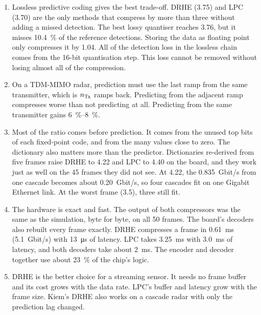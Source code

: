 \begin{enumerate}
\item Lossless predictive coding gives the best trade-off. DRHE (\num{3.75})
and LPC (\num{3.70}) are the only methods that compress by more than three
without adding a missed detection. The best lossy quantiser reaches
\num{3.76}, but it misses \SI{10.4}{\percent} of the reference detections.
Storing the data as floating point only compresses it by \num{1.04}. All of the
detection loss in the lossless chain comes from the 16-bit quantisation step.
This loss cannot be removed without losing almost all of the compression.

\item On a TDM-MIMO radar, prediction must use the last ramp from the same
transmitter, which is $n_{\mathrm{Tx}}$ ramps back. Predicting from the adjacent ramp
compresses worse than not predicting at all. Predicting from the same
transmitter gains \SIrange{6}{8}{\percent}.

\item Most of the ratio comes before prediction. It comes from the unused top
bits of each fixed-point code, and from the many values close to zero. The
dictionary also matters more than the predictor. Dictionaries re-derived from
five frames raise DRHE to \num{4.22} and LPC to \num{4.40} on the board, and
they work just as well on the 45 frames they did not see. At \num{4.22}, the
\SI{0.835}{Gbit/s} from one cascade becomes about \SI{0.20}{Gbit/s}, so four
cascades fit on one Gigabit Ethernet link. At the worst frame (\num{3.5}),
three still fit.

\item The hardware is exact and fast. The output of both compressors was the
same as the simulation, byte for byte, on all 50 frames. The board's decoders
also rebuilt every frame exactly. DRHE compresses a frame in
\SI{0.61}{\milli\second} (\SI{5.1}{Gbit/s}) with \SI{13}{\micro\second} of
latency. LPC takes \SI{3.25}{\milli\second} with \SI{3.0}{\milli\second} of
latency, and both decoders take about \SI{2}{\milli\second}. The encoder and
decoder together use about \SI{23}{\percent} of the chip's logic.

\item DRHE is the better choice for a streaming sensor. It needs no frame
buffer and its cost grows with the data rate. LPC's buffer and latency grow
with the frame size. Kiem's DRHE also works on a cascade radar with only the
prediction lag changed.
\end{enumerate}

